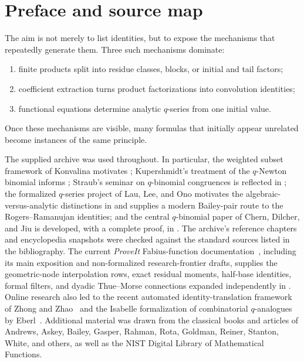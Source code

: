 \documentclass[11pt,a4paper,oneside,openany]{book}
\theoremstyle{definition}
\theoremstyle{remark}
\begin{document}
\chapter*{Preface and source map}
The aim is not merely to list identities, but to expose the mechanisms that repeatedly generate them.  Three such mechanisms dominate:
\begin{enumerate}
\item finite products split into residue classes, blocks, or initial and tail factors;
\item coefficient extraction turns product factorizations into convolution identities;
\item functional equations determine analytic $q$-series from one initial value.
\end{enumerate}
Once these mechanisms are visible, many formulas that initially appear unrelated become instances of the same principle.

The supplied archive was used throughout.  In particular, the weighted subset framework of Konvalina motivates ; Kupershmidt's treatment of the $q$-Newton binomial informs ; Straub's seminar on $q$-binomial congruences is reflected in ; the formalized $q$-series project of Lau, Lee, and Ono motivates the algebraic-versus-analytic distinctions in  and supplies a modern Bailey-pair route to the Rogers--Ramanujan identities; and the central $q$-binomial paper of Chern, Dilcher, and Jiu is developed, with a complete proof, in .  The archive's reference chapters and encyclopedia snapshots were checked against the standard sources listed in the bibliography.  The current \emph{ProveIt} Fabius-function documentation~\cite{ReshetnikovProveIt2026}, including its main exposition and non-formalized research-frontier drafts, supplies the geometric-node interpolation rows, exact residual moments, half-base identities, formal filters, and dyadic Thue--Morse connections expanded independently in .  Online research also led to the recent automated identity-translation framework of Zhong and Zhao~\cite{ZhongZhao2026} and the Isabelle formalization of combinatorial $q$-analogues by Eberl~\cite{Eberl2024QAnalogues}.  Additional material was drawn from the classical books and articles of Andrews, Askey, Bailey, Gasper, Rahman, Rota, Goldman, Reiner, Stanton, White, and others, as well as the NIST Digital Library of Mathematical Functions.
\end{document}
